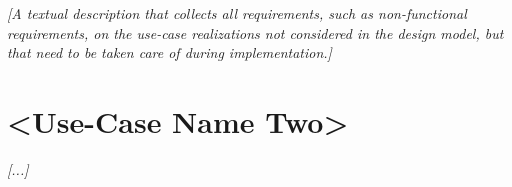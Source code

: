 \documentclass[12pt, a4paper, titlepage]{article}
\begin{document}
{\color{blue}\textit{[A textual description that collects all requirements, such as non-functional requirements, on the use-case realizations not considered in the design model, but that need to be taken care of during implementation.]}}

\section{\textless Use-Case Name Two\textgreater}

{\color{blue}\textit{[...]}}
\end{document}
